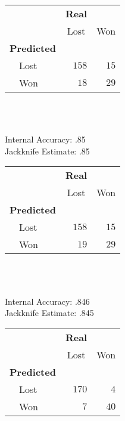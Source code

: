 \documentclass[jou,apacite]{apa6}
\begin{document}
\begin{table*}
\caption{Confusion matrices for all 6 races}
{\footnotesize
\begin{minipage}{.33\textwidth}
\caption*{Lead Actor}
\begin{tabular}{lrr}
\hline\hline
\multicolumn{1}{l}{}&\multicolumn{1}{c}{\bfseries{Real}}&\multicolumn{1}{c}{}\tabularnewline
&\multicolumn{1}{c}{\scriptsize Lost}&\multicolumn{1}{c}{\scriptsize Won}\tabularnewline
\hline
{\bfseries Predicted}&&\tabularnewline
~~Lost&$158$&$15$\tabularnewline
~~Won&$ 18$&$29$\tabularnewline
\hline
\end{tabular} \\ \\
\begin{tablenotes}
\item Internal Accuracy: .85 \\
 Jackknife Estimate: .85
\end{tablenotes}
\end{minipage}
\begin{minipage}{.33\textwidth}
\caption*{Supporting Actor}
\begin{tabular}{lrr}
\hline\hline
\multicolumn{1}{l}{}&\multicolumn{1}{c}{\textbf{Real}}&\multicolumn{1}{c}{}\tabularnewline
&\multicolumn{1}{c}{{\scriptsize Lost}}&\multicolumn{1}{c}{{\scriptsize Won}}\tabularnewline
\hline
{\bfseries Predicted}&&\tabularnewline
~~Lost&$158$&$15$\tabularnewline
~~Won&$ 19$&$29$\tabularnewline
\hline
\end{tabular} \\ \\
\begin{tablenotes}
\item Internal Accuracy: .846 \\
Jackknife Estimate: .845
\end{tablenotes}
\end{minipage}
\begin{minipage}{.33\textwidth}
\caption*{Direction}
\begin{tabular}{lrr}
\hline\hline
\multicolumn{1}{l}{}&\multicolumn{1}{c}{\textbf{Real}}&\multicolumn{1}{c}{}\tabularnewline
&\multicolumn{1}{c}{{\scriptsize Lost}}&\multicolumn{1}{c}{{\scriptsize Won}}\tabularnewline
\hline
{\bfseries Predicted}&&\tabularnewline
~~Lost&$170$&$4$\tabularnewline
~~Won&$ 7$&$40$\tabularnewline
\hline
\end{tabular} \\ \\
\begin{tablenotes}

\end{tablenotes}
\end{minipage}}
\end{table*}
\end{document}
